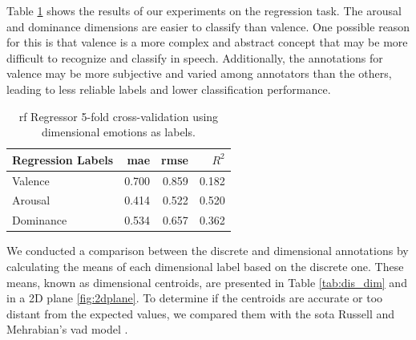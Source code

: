 Table \ref{tab:dim_reg} shows the results of our experiments on the regression task. The arousal and dominance dimensions are easier to classify than valence. One possible reason for this is that valence is a more complex and abstract concept that may be more difficult to recognize and classify in speech. Additionally, the annotations for valence may be more subjective and varied among annotators than the others, leading to less reliable labels and lower classification performance.


\begin{table}[H]
	\centering
	\caption{\ac{rf} Regressor 5-fold cross-validation using dimensional emotions as labels.}
	\label{tab:dim_reg}
	\begin{tabular}{lrrr}
		\toprule
		Regression Labels   &   \ac{mae} &  \ac{rmse} & $R^2$ \\
		\midrule
		Valence             & 0.700 & 0.859 & 0.182 \\
		Arousal             & 0.414 & 0.522 & 0.520 \\
		Dominance           & 0.534 & 0.657 & 0.362 \\
		\bottomrule
	\end{tabular}
\end{table}

We conducted a comparison between the discrete and dimensional annotations by calculating the means of each dimensional label based on the discrete one. These means, known as dimensional centroids, are presented in Table \ref{tab:dis_dim} and in a 2D plane \ref{fig:2dplane}. To determine if the centroids are accurate or too distant from the expected values, we compared them with the \ac{sota} Russell and Mehrabian's \ac{vad} model \cite{RUSSELL1977273}. 

